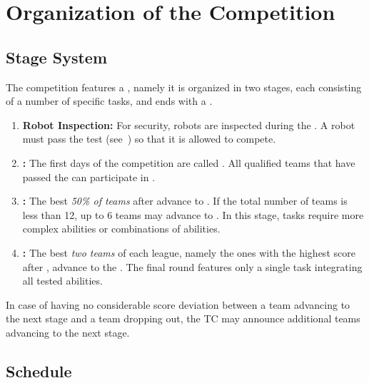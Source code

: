 \section{Organization of the Competition}
\label{sec:procedure_during_competition}

\subsection{Stage System}\label{rule:stages}

The competition features a , namely it is organized in two stages, each consisting of a number of specific tasks, and ends with a \FINAL.
\begin{enumerate}
	\item \textbf{Robot Inspection:} For security, robots are inspected during the \SetupDays.
	A robot must pass the \RobotInspection{} test (see~) so that it is allowed to compete.

	\item \textbf{\SONE:} The first days of the competition are called \SONE.
	All qualified teams that have passed the \RobotInspection{} can participate in \SONE.


	\item \textbf{\STWO:} The best \emph{50\% of teams} after \SONE{} advance to \STWO. If the total number of teams is less than 12, up to 6 teams may advance to \STWO.
	In this stage, tasks require more complex abilities or combinations of abilities.

	\item \textbf{\FINAL:} The best \emph{two teams} of each league, namely the ones with the highest score after \STWO, advance to the \FINAL.
	The final round features only a single task integrating all tested abilities.

\end{enumerate}
In case of having no considerable score deviation between a team advancing to the next stage and a team dropping out, the TC may announce additional teams advancing to the next stage.


\subsection{Schedule}
\label{rule:schedule}

